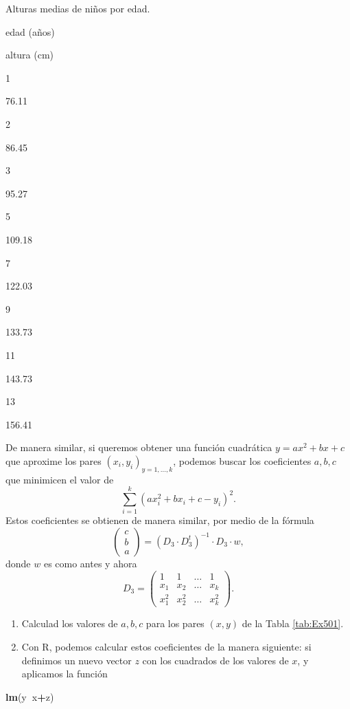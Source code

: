 \documentclass[]{book}
\newenvironment{Shaded}{\begin{snugshade}}{\end{snugshade}}
\newcommand{\KeywordTok}[1]{\textcolor[rgb]{0.13,0.29,0.53}{\textbf{#1}}}
\newcommand{\NormalTok}[1]{#1}
\newcommand{\OperatorTok}[1]{\textcolor[rgb]{0.81,0.36,0.00}{\textbf{#1}}}
\theoremstyle{definition}
\theoremstyle{definition}
\theoremstyle{definition}
\theoremstyle{remark}
\begin{document}
\label{tab:Ex501}Alturas medias de niños por edad.

edad (años)

altura (cm)

1

76.11

2

86.45

3

95.27

5

109.18

7

122.03

9

133.73

11

143.73

13

156.41

De manera similar, si queremos obtener una función cuadrática \(y=a x^2+b x+c\) que aproxime los pares \((x_i, y_i)_{y=1, \ldots, k}\), podemos buscar los coeficientes \(a, b, c\) que minimicen el valor de
\[
\sum_{i=1}^k (ax_{i}^2+bx_{i}+c-y_{i})^2.
\]
Estos coeficientes se obtienen de manera similar, por medio de la fórmula
\[
\left(\begin{matrix}
c\\ b\\ a \end{matrix}
\right)=
(D_{3}\cdot D_{3}^t)^{-1}\cdot D_{3}\cdot w, 
\]
donde \(w\) es como antes y ahora
\[
D_{3}=\left(\begin{matrix}
1 & 1 & \ldots & 1 \\
x_{1} & x_{2} & \ldots & x_{k}\\[0.5ex]
x_{1}^2 & x_{2}^2 & \ldots & x_{k}^2
\end{matrix}
\right).
\]

\begin{enumerate}
\def\labelenumi{\alph{enumi}.}
\setcounter{enumi}{1}
\item
  Calculad los valores de \(a, b, c\) para los pares \((x,y)\) de la Tabla \ref{tab:Ex501}.
\item
  Con R, podemos calcular estos coeficientes de la manera siguiente: si definimos un nuevo vector \(z\) con los cuadrados de los valores de \(x\), y aplicamos la función
\end{enumerate}

\begin{Shaded}
\begin{Highlighting}[]
\KeywordTok{lm}\NormalTok{(y}\OperatorTok{~}\NormalTok{x}\OperatorTok{+}\NormalTok{z)}
\end{Highlighting}
\end{Shaded}
\end{document}
